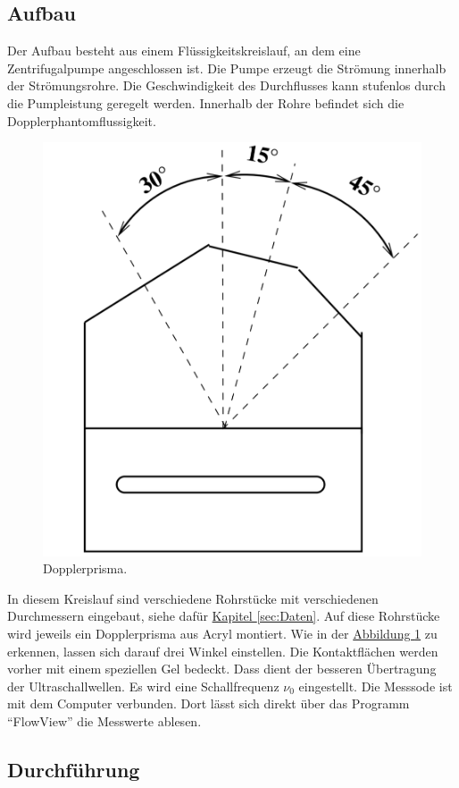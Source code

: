 \subsection{Aufbau}
Der Aufbau besteht aus einem Flüssigkeitskreislauf, an dem eine Zentrifugalpumpe angeschlossen ist.
Die Pumpe erzeugt die Strömung innerhalb der Strömungsrohre. Die Geschwindigkeit des Durchflusses kann stufenlos
durch die Pumpleistung geregelt werden. Innerhalb der Rohre befindet sich die Dopplerphantomflussigkeit.
\begin{figure} \label{fig:Skizze2}
    \center
    \includegraphics[width=\linewidth]{pictures/Skizze2.pdf}
    \caption{Dopplerprisma.}
\end{figure}
In diesem Kreislauf sind verschiedene Rohrstücke mit verschiedenen Durchmessern eingebaut, siehe dafür \hyperref[sec:Daten]{Kapitel \ref{sec:Daten}}.
Auf diese Rohrstücke wird jeweils ein Dopplerprisma aus Acryl montiert.
Wie in der \hyperref[fig:Skizze2]{Abbildung \ref{fig:Skizze2}} zu erkennen, lassen sich darauf drei Winkel einstellen.
Die Kontaktflächen werden vorher mit einem speziellen Gel bedeckt.
Dass dient der besseren Übertragung der Ultraschallwellen.
Es wird eine Schallfrequenz $\nu_0$ eingestellt.
Die Messsode ist mit dem Computer verbunden. Dort lässt sich direkt über das Programm \enquote{FlowView} die Messwerte ablesen.
\subsection{Durchführung}
